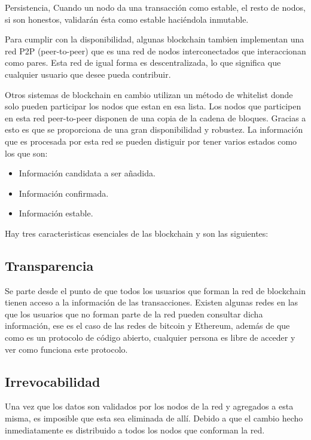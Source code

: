 \documentclass[conference]{IEEEtran}
\begin{document}
Persistencia, Cuando un nodo da una transacción como estable, el resto de nodos, si son honestos, validarán ésta como estable haciéndola inmutable.

Para cumplir con la disponibilidad, algunas blockchain tambien implementan una red P2P (peer-to-peer) que es una red de nodos interconectados que interaccionan como pares. Esta red de igual forma es descentralizada, lo que significa que cualquier usuario que desee pueda contribuir.

Otros sistemas de blockchain en cambio utilizan un método de whitelist donde solo pueden participar los nodos que estan en esa lista. Los nodos que participen en esta red peer-to-peer disponen de una copia de la cadena de bloques. Gracias a esto es que se proporciona de una gran disponibilidad y robustez. La información que es procesada por esta red se pueden distiguir por tener varios estados como los que son:

\begin{itemize}
    \item Información candidata a ser añadida.
    \item Información confirmada.
    \item Información estable.
\end{itemize}

Hay tres caracteristicas esenciales de las blockchain y son las siguientes:

\subsection{Transparencia}

Se parte desde el punto de que todos los usuarios que forman la red de blockchain tienen acceso a la información de las transacciones. Existen algunas redes en las que los usuarios que no forman parte de la red pueden consultar dicha información, ese es el caso de las redes de bitcoin y Ethereum, además de que como es un protocolo de código abierto, cualquier persona es libre de acceder y ver como funciona este protocolo.

\subsection{Irrevocabilidad}

Una vez que los datos son validados por los nodos de la red y agregados a esta misma, es imposible que esta sea eliminada de allí. Debido a que el cambio hecho inmediatamente es distribuido a todos los nodos que conforman la red.
\end{document}
